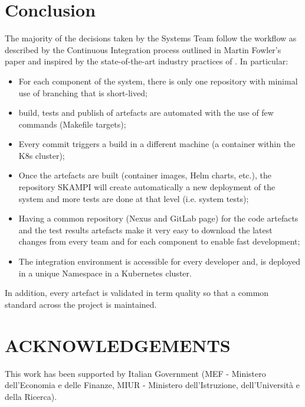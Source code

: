 \documentclass[a4paper,
               keeplastbox,   %
               ]{jacow}
\begin{document}
\section{Conclusion}
The majority of the decisions taken by the Systems Team follow the workflow as described by the Continuous Integration process outlined in Martin Fowler’s paper and inspired by the state-of-the-art industry practices of \cite{DevOps, CI, CD}. In particular:
\begin{itemize}
    \item For each component of the system, there is only one repository with minimal use of branching that is short-lived;
    \item build, tests and publish of artefacts are automated with the use of few commands (Makefile targets);
    \item Every commit triggers a build in a different machine (a container within the K8s cluster);
    \item Once the artefacts are built (container images, Helm charts, etc.), the repository SKAMPI will create automatically a new deployment of the system and more tests are done at that level (i.e. system tests);
    \item Having a common repository (Nexus and GitLab page) for the code artefacts and the test results artefacts make it very easy to download the latest changes from every team and for each component to enable fast development;
    \item The integration environment is accessible for every developer and, is deployed in a unique Namespace in a Kubernetes cluster.
\end{itemize}

In addition, every artefact is validated in term quality so that a common standard across the project is maintained.

\section{ACKNOWLEDGEMENTS}
This work has been supported by Italian Government (MEF - Ministero dell'Economia e delle Finanze, MIUR - Ministero dell'Istruzione, dell'Università e della Ricerca).
\end{document}
